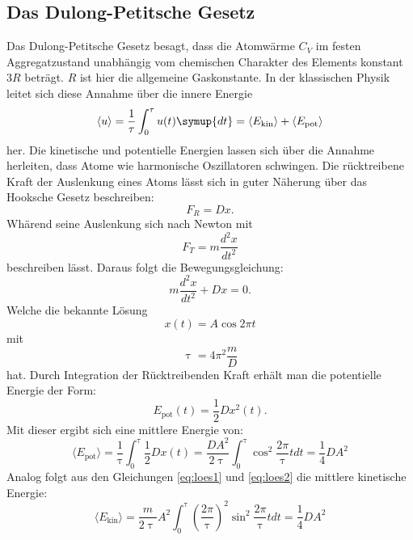 \subsection{Das Dulong-Petitsche Gesetz}
Das Dulong-Petitsche Gesetz besagt, dass die Atomwärme $C_V$ im festen Aggregatzustand
unabhängig vom chemischen Charakter des Elements konstant $3R$ beträgt.
$R$ ist hier die allgemeine Gaskonstante.
In der klassischen Physik leitet sich diese Annahme über die innere Energie
 \begin{equation}
 \langle u \rangle = \frac{1}{\tau} \int_0^\tau u(t)\symup{dt} = \langle E_\text{kin} \rangle + \langle
E_\text{pot} \rangle
 \end{equation}
her.
Die kinetische und potentielle Energien lassen sich über die Annahme herleiten, dass Atome
wie harmonische Oszillatoren schwingen.
Die rücktreibene Kraft der Auslenkung eines Atoms lässt sich in guter Näherung über das Hooksche Gesetz beschreiben:
\begin{equation}
  F_R= Dx .
\end{equation}
Whärend seine Auslenkung sich nach Newton mit
\begin{equation}
  F_T=   m \frac{d^2 x}{dt^2}
\end{equation}
beschreiben lässt.
Daraus folgt die Bewegungsgleichung:
\begin{equation}
  m \frac{d^2 x}{dt^2}+Dx=0 .
\end{equation}
Welche die bekannte Lösung
\begin{equation}
  \label{eq:loes1}
  x(t)=A \cos{2\pi t}
\end{equation}
mit
\begin{equation}
  \label{eq:loes2}
  \uptau = 4 \pi^2 \frac{m}{D}
\end{equation}
hat.
Durch Integration der Rücktreibenden Kraft erhält man die potentielle Energie der Form:
\begin{equation}
  E_\text{pot}(t) = \frac{1}{2}Dx^2(t).
\end{equation}
Mit dieser ergibt sich eine mittlere Energie von:
\begin{equation}
  \langle E_\text{pot} \rangle = \frac{1}{\uptau} \int_0^\uptau \frac{1}{2}Dx(t)=\frac{DA^2}{2\uptau}\int_0^\uptau \cos^2{\frac{2\pi}{\uptau}t}dt =\frac{1}{4}DA^2
\end{equation}
Analog folgt aus den Gleichungen \eqref{eq:loes1} und \eqref{eq:loes2} die mittlere kinetische Energie:
\begin{equation}
  \langle E_\text{kin} \rangle = \frac{m}{2\uptau} A^2 \int_0^\uptau (\frac{2\pi}{\uptau})^2 \sin^2{\frac{2\pi}{\uptau}t} dt = \frac{1}{4}DA^2
\end{equation}
